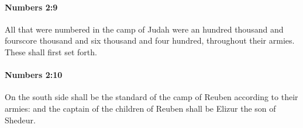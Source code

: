 		\paragraph{Numbers 2:9} %
			\label{NUMBERS-2-9}

			All that were numbered in the camp of Judah were an hundred thousand and fourscore thousand and six thousand and four hundred, throughout their armies. These shall first set forth.


		\paragraph{Numbers 2:10} %
			\label{NUMBERS-2-10}

			On the south side shall be the standard of the camp of Reuben according to their armies: and the captain of the children of Reuben shall be Elizur the son of Shedeur.



